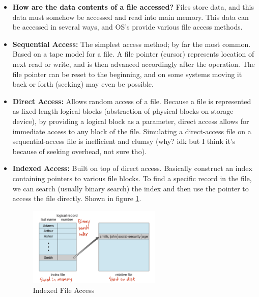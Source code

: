 \documentclass[12pt]{article}
\begin{document}
\begin{itemize}
    \item \textbf{How are the data contents of a file accessed?} Files store data, and this data must somehow be accessed and read into main memory. This data can be accessed in several ways, and OS's provide various file access methods.
    \item \textbf{Sequential Access:} The simplest access method; by far the most common. Based on a tape model for a file. A file pointer (cursor) represents location of next read or write, and is then advanced accordingly after the operation. The file pointer can be reset to the beginning, and on some systems moving it back or forth (seeking) may even be possible.
    \item \textbf{Direct Access:} Allows random access of a file. Because a file is represented as fixed-length logical blocks (abstraction of physical blocks on storage device), by providing a logical block as a parameter, direct access allows for immediate access to any block of the file. Simulating a direct-access file on a sequential-access file is inefficient and clumsy (why? idk but I think it's because of seeking overhead, not sure tho).
    \item \textbf{Indexed Access:} Built on top of direct access. Basically construct an index containing pointers to various file blocks. To find a specific record in the file, we can search (usually binary search) the index and then use the pointer to access the file directly. Shown in figure \ref{fig:indexed-file-access}.
        \begin{figure}[ht]
            \centering
            \includegraphics[width=0.6\textwidth]{figures/indexed-file-access.jpg}
            \caption{Indexed File Access}
            \label{fig:indexed-file-access}
        \end{figure}
\end{itemize}


\end{document}
